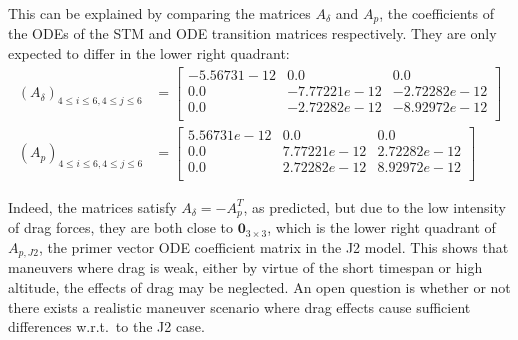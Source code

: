 This can be explained by comparing the matrices \(A_\delta\) and \(A_p\), the coefficients of the ODEs of the STM and ODE transition matrices respectively. They are only expected to differ in the lower right quadrant:
\begin{align}
    (A_\delta)_{4\leq i \leq 6, 4 \leq j \leq 6} &= \begin{bmatrix}
        -5.56731-12 & 0.0 & 0.0 \\
        0.0 & -7.77221e-12    & -2.72282e-12 \\
        0.0 & -2.72282e-12    & -8.92972e-12 \\
    \end{bmatrix} \\
    (A_p)_{4\leq i \leq 6, 4 \leq j \leq 6} &= \begin{bmatrix}
        5.56731e-12 & 0.0 & 0.0 \\
        0.0 & 7.77221e-12 & 2.72282e-12 \\
        0.0 & 2.72282e-12 & 8.92972e-12 \\
    \end{bmatrix}
\end{align}

Indeed, the matrices satisfy \(A_\delta = - A_p^T\), as predicted, but due to the low intensity of drag forces, they are both close to \(\mathbf{0}_{3\times 3}\), which is the lower right quadrant of \(A_{p, J2}\), the primer vector ODE coefficient matrix in the J2 model. This shows that maneuvers where drag is weak, either by virtue of the short timespan or high altitude, the effects of drag may be neglected. An open question is whether or not there exists a realistic maneuver scenario where drag effects cause sufficient differences w.r.t.\ to the J2 case.